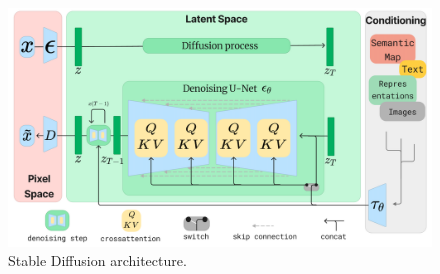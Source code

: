\begin{figure}[H] 
\centering
\includegraphics[width=\columnwidth]{main/content/images/diagrams/diagram_sd.png}
\caption{Stable Diffusion architecture.}
\label{fig:sd_diagram}
\end{figure}